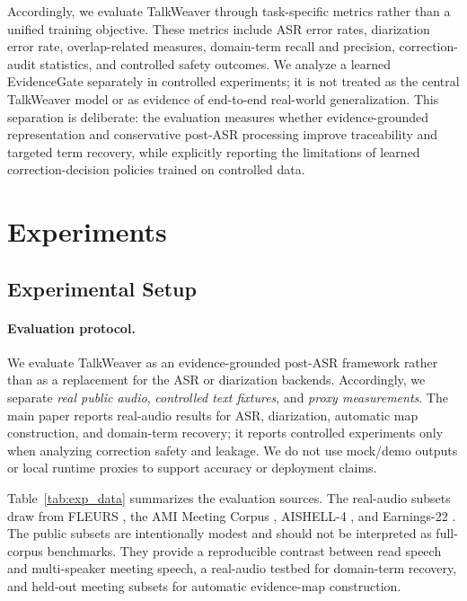 \documentclass[10pt,twocolumn]{article}
\begin{document}
Accordingly, we evaluate TalkWeaver through task-specific metrics rather than a unified training objective. These metrics include ASR error rates, diarization error rate, overlap-related measures, domain-term recall and precision, correction-audit statistics, and controlled safety outcomes. We analyze a learned EvidenceGate separately in controlled experiments; it is not treated as the central TalkWeaver model or as evidence of end-to-end real-world generalization. This separation is deliberate: the evaluation measures whether evidence-grounded representation and conservative post-ASR processing improve traceability and targeted term recovery, while explicitly reporting the limitations of learned correction-decision policies trained on controlled data.


\section{Experiments}
\label{sec:experiments}

\subsection{Experimental Setup}

\paragraph{Evaluation protocol.}
We evaluate TalkWeaver as an evidence-grounded post-ASR framework rather than as a replacement for the ASR or diarization backends. Accordingly, we separate \emph{real public audio}, \emph{controlled text fixtures}, and \emph{proxy measurements}. The main paper reports real-audio results for ASR, diarization, automatic map construction, and domain-term recovery; it reports controlled experiments only when analyzing correction safety and leakage. We do not use mock/demo outputs or local runtime proxies to support accuracy or deployment claims.

Table~\ref{tab:exp_data} summarizes the evaluation sources. The real-audio subsets draw from FLEURS \cite{conneau2022fleurs}, the AMI Meeting Corpus \cite{carletta2005ami}, AISHELL-4 \cite{fu2021aishell4}, and Earnings-22 \cite{delrio2022earnings22}. The public subsets are intentionally modest and should not be interpreted as full-corpus benchmarks. They provide a reproducible contrast between read speech and multi-speaker meeting speech, a real-audio testbed for domain-term recovery, and held-out meeting subsets for automatic evidence-map construction.
\end{document}
